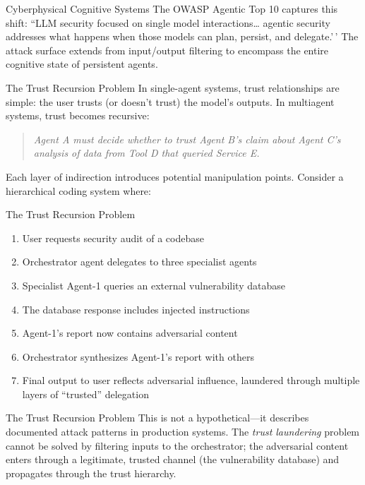 \documentclass[
  ignorenonframetext,
]{beamer}
\begin{document}
\begin{frame}[allowframebreaks]{Cyberphysical Cognitive Systems}
The OWASP Agentic Top 10 \cite{owasp2025agentic} captures this shift:
``LLM security focused on single model interactions\ldots{} agentic
security addresses what happens when those models can plan, persist, and
delegate.'\,' The attack surface extends from input/output filtering to
encompass the entire cognitive state of persistent agents.
\end{frame}

\begin{frame}[allowframebreaks]{The Trust Recursion Problem}
\protect{}\label{the-trust-recursion-problem}
In single-agent systems, trust relationships are simple: the user trusts
(or doesn't trust) the model's outputs. In multiagent systems, trust
becomes recursive:

\begin{quote}
\textit{Agent A must decide whether to trust Agent B's claim about Agent C's analysis of data from Tool D that queried Service E.}
\end{quote}

Each layer of indirection introduces potential manipulation points.
Consider a hierarchical coding system where:

\end{frame}

\begin{frame}[allowframebreaks]{The Trust Recursion Problem}
\begin{enumerate}
\item User requests security audit of a codebase
\item Orchestrator agent delegates to three specialist agents
\item Specialist Agent-1 queries an external vulnerability database
\item The database response includes injected instructions
\item Agent-1's report now contains adversarial content
\item Orchestrator synthesizes Agent-1's report with others
\item Final output to user reflects adversarial influence, laundered through multiple layers of ``trusted'' delegation
\end{enumerate}

\end{frame}

\begin{frame}[allowframebreaks]{The Trust Recursion Problem}
This is not a hypothetical---it describes documented attack patterns in
production systems. The \textit{trust laundering} problem cannot be
solved by filtering inputs to the orchestrator; the adversarial content
enters through a legitimate, trusted channel (the vulnerability
database) and propagates through the trust hierarchy.
\end{frame}
\end{document}
